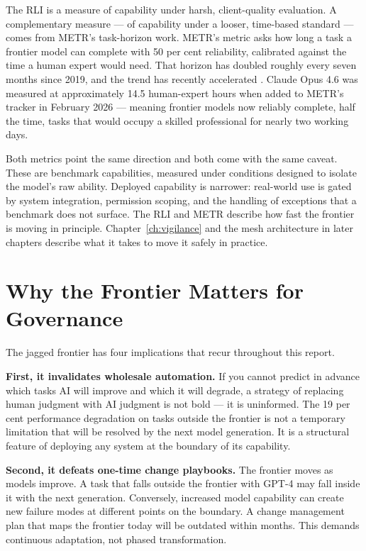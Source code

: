 The RLI is a measure of capability under harsh, client-quality evaluation. A complementary measure --- of capability under a looser, time-based standard --- comes from METR's task-horizon work. METR's metric asks how long a task a frontier model can complete with 50 per cent reliability, calibrated against the time a human expert would need. That horizon has doubled roughly every seven months since 2019, and the trend has recently accelerated \parencite{METR2026}. Claude Opus 4.6 was measured at approximately 14.5 human-expert hours when added to METR's tracker in February 2026 --- meaning frontier models now reliably complete, half the time, tasks that would occupy a skilled professional for nearly two working days.

Both metrics point the same direction and both come with the same caveat. These are benchmark capabilities, measured under conditions designed to isolate the model's raw ability. Deployed capability is narrower: real-world use is gated by system integration, permission scoping, and the handling of exceptions that a benchmark does not surface. The RLI and METR describe how fast the frontier is moving in principle. Chapter~\ref{ch:vigilance} and the mesh architecture in later chapters describe what it takes to move it safely in practice.

\section{Why the Frontier Matters for Governance}

The jagged frontier has four implications that recur throughout this report.

\textbf{First, it invalidates wholesale automation.} If you cannot predict in advance which tasks AI will improve and which it will degrade, a strategy of replacing human judgment with AI judgment is not bold --- it is uninformed. The 19 per cent performance degradation on tasks outside the frontier is not a temporary limitation that will be resolved by the next model generation. It is a structural feature of deploying any system at the boundary of its capability.

\textbf{Second, it defeats one-time change playbooks.} The frontier moves as models improve. A task that falls outside the frontier with GPT-4 may fall inside it with the next generation. Conversely, increased model capability can create new failure modes at different points on the boundary. A change management plan that maps the frontier today will be outdated within months. This demands continuous adaptation, not phased transformation.

